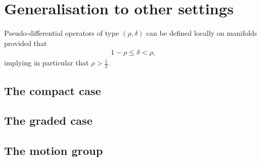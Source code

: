 \section{Generalisation to other settings}

Pseudo-differential operators of type $(\rho, \delta)$ can be defined locally on manifolds provided that
\begin{align*}
    1 - \rho \leq \delta < \rho,
\end{align*}
implying in particular that $\rho > \frac 1 2$.

\subsection{The compact case}

\subsection{The graded case}

\subsection{The motion group}

